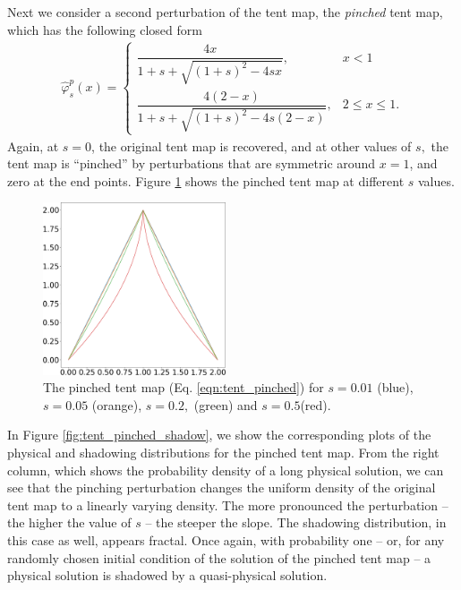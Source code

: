\documentclass[preprint,12pt]{elsarticle}
\begin{document}
Next we consider a second perturbation of the tent map, the \emph{pinched} tent map, which has the following closed form
\begin{align}
    \hat{\varphi}^p_s(x) = \begin{cases}
        \dfrac{4x}{1 + s + \sqrt{(1+s)^2 - 4s x} }, & x < 1 \\
        \dfrac{4(2-x)}{1 + s + \sqrt{(1+s)^2 - 4s(2- x)} }, & 2 \leq x \leq 1.
    \end{cases}
    \label{eqn:tent_pinched}
\end{align}
Again, at $s=0$, the original tent map is recovered, and at other values of $s,$ the tent map is ``pinched'' by perturbations that are symmetric around $x = 1$, and zero at the end points. Figure \ref{fig:tent_pinched} shows the pinched tent map at different $s$ values.  
\begin{figure}
    \centering
    \includegraphics[width=0.48\textwidth]{pinched_tent_map.png}
    \caption{The pinched tent map (Eq. \ref{eqn:tent_pinched}) for $s = 0.01$ (blue), $s=0.05$ (orange), $s=0.2,$ (green) and $s=0.5$(red).}
    \label{fig:tent_pinched}
\end{figure}
In Figure \ref{fig:tent_pinched_shadow}, we show the corresponding plots of the 
physical and shadowing distributions for the pinched tent map. From the right 
column, which shows the probability density of a long physical solution, we 
can see that the pinching perturbation changes the uniform density of the original tent map to a linearly varying density. The more pronounced the perturbation -- the higher the value of $s$ -- the steeper the slope. The shadowing distribution, in this case as well, appears fractal. Once again, with probability one -- or, for any randomly chosen initial condition of the solution of the pinched tent map -- a physical solution is shadowed by a quasi-physical solution.
\end{document}
